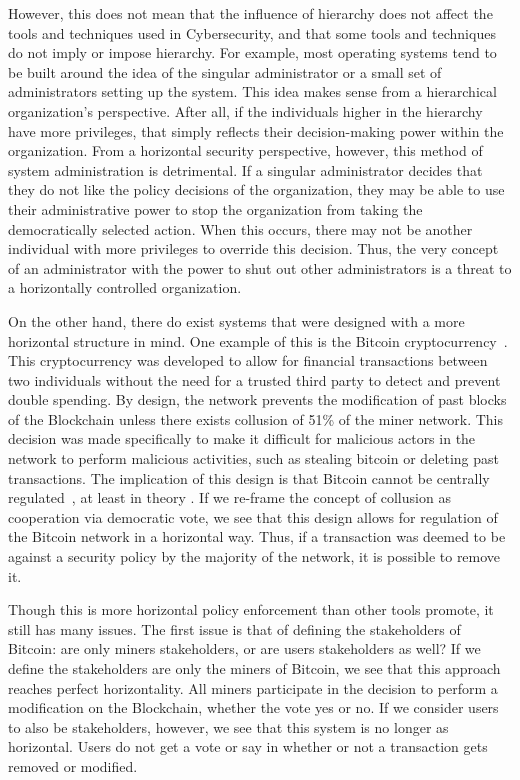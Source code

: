 However, this does not mean that the influence of hierarchy does not affect the
tools and techniques used in Cybersecurity, and that some tools and techniques
do not imply or impose hierarchy. For example, most operating systems
tend to be built around the idea of the singular administrator or a small set of
administrators setting up the system. This idea makes sense from a  hierarchical
organization's perspective. After all, if the individuals higher in the
hierarchy have more privileges, that simply reflects their decision-making 
power within the organization. From a horizontal security perspective, however,
this method of system administration is detrimental. If a singular administrator
decides that they do not like the policy decisions of the organization, they may
be able to use their administrative power to stop the organization from taking
the democratically selected action. When this occurs, there may not be another
individual with more privileges to override this decision. Thus, the very
concept of an administrator with the power to shut out other administrators is a
threat to a horizontally controlled organization.

On the other hand, there do exist systems that were designed with a more
horizontal structure in mind. One example of this is the Bitcoin 
cryptocurrency~\cite{nakamoto2019bitcoin}. This cryptocurrency was developed to
allow for financial transactions between two individuals without the need for a
trusted third party to detect and prevent double spending. By design, the
network prevents the modification of past blocks of the Blockchain unless there
exists collusion of 51\% of the miner network. This decision was made
specifically to make it difficult for malicious actors in the network to perform
malicious activities, such as stealing bitcoin or deleting past transactions.
The implication of this design is that Bitcoin cannot be centrally 
regulated~\cite{tu2015rethinking}, at least in theory . If we re-frame the
concept of collusion as cooperation via democratic vote, we see that this design
allows for regulation of the Bitcoin network in a horizontal way. Thus, if a
transaction was deemed to be against a security policy by the majority of the
network, it is possible to remove it.

Though this is more horizontal policy enforcement than other tools promote, it
still has many issues. The first issue is that of defining the stakeholders of
Bitcoin: are only miners stakeholders, or are users stakeholders as well? If we
define the stakeholders are only the miners of Bitcoin, we see that this
approach reaches perfect horizontality. All miners participate in the decision
to perform a modification on the Blockchain, whether the vote yes or no. If we
consider users to also be stakeholders, however, we see that this system is no
longer as horizontal. Users do not get a vote or say in whether or not a
transaction gets removed or modified. 

